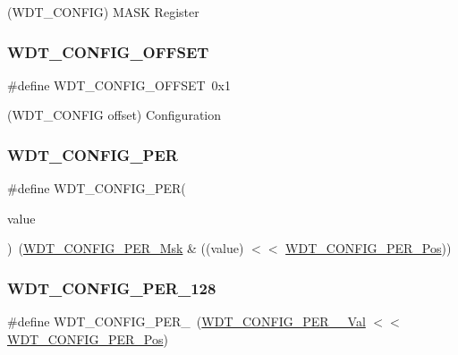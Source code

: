 (W\+D\+T\+\_\+\+C\+O\+N\+F\+IG) M\+A\+SK Register 

\mbox{\label{group___s_a_m_d21___w_d_t_ga0d3293445b10bdfdf733067d75f7b98c}} 
\subsubsection{\texorpdfstring{WDT\_CONFIG\_OFFSET}{WDT\_CONFIG\_OFFSET}}
{\footnotesize\ttfamily \#define W\+D\+T\+\_\+\+C\+O\+N\+F\+I\+G\+\_\+\+O\+F\+F\+S\+ET~0x1}



(W\+D\+T\+\_\+\+C\+O\+N\+F\+IG offset) Configuration 

\mbox{\label{group___s_a_m_d21___w_d_t_gac92933c61d3b2a10b9b14e2c68dcc5c8}} 
\subsubsection{\texorpdfstring{WDT\_CONFIG\_PER}{WDT\_CONFIG\_PER}}
{\footnotesize\ttfamily \#define W\+D\+T\+\_\+\+C\+O\+N\+F\+I\+G\+\_\+\+P\+ER(\begin{DoxyParamCaption}\item[{}]{value }\end{DoxyParamCaption})~(\mbox{\hyperlink{group___s_a_m_d21___w_d_t_ga7b17345103d170e4fc578db43ad0987e}{W\+D\+T\+\_\+\+C\+O\+N\+F\+I\+G\+\_\+\+P\+E\+R\+\_\+\+Msk}} \& ((value) $<$$<$ \mbox{\hyperlink{group___s_a_m_d21___w_d_t_ga55662a2fa7e16fd6cc7a5e0800034360}{W\+D\+T\+\_\+\+C\+O\+N\+F\+I\+G\+\_\+\+P\+E\+R\+\_\+\+Pos}}))}

\mbox{\label{group___s_a_m_d21___w_d_t_gaaa2d0d86013eff7628257b4ac65e69e0}} 
\subsubsection{\texorpdfstring{WDT\_CONFIG\_PER\_128}{WDT\_CONFIG\_PER\_128}}
{\footnotesize\ttfamily \#define W\+D\+T\+\_\+\+C\+O\+N\+F\+I\+G\+\_\+\+P\+E\+R\+\_~(\mbox{\hyperlink{group___s_a_m_d21___w_d_t_ga98986d614bb272ac1dab43e9d98f0beb}{W\+D\+T\+\_\+\+C\+O\+N\+F\+I\+G\+\_\+\+P\+E\+R\+\_\+\_\+\+Val}}        $<$$<$ \mbox{\hyperlink{group___s_a_m_d21___w_d_t_ga55662a2fa7e16fd6cc7a5e0800034360}{W\+D\+T\+\_\+\+C\+O\+N\+F\+I\+G\+\_\+\+P\+E\+R\+\_\+\+Pos}})}


